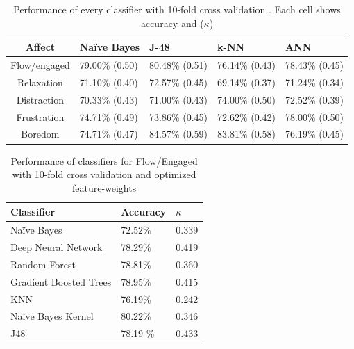 \documentclass[a4paper,twoside]{article}
\begin{document}
\begin{table}[!t]
\centering
\caption{Performance of every classifier with 10-fold cross validation \cite{ijcci17}. Each cell shows accuracy and ($\kappa$)}
\label{tab_performance}
    \begin{tabular}{ | c | l | l | l | l | }
    \hline
    Affect          & Na\"ive Bayes           & J-48                & k-NN              & ANN \\
    \hline
    Flow/engaged    & 79.00\% (0.50) & 80.48\% (0.51) & 76.14\% (0.43) & 78.43\% (0.45) \\
    \hline
    Relaxation      & 71.10\% (0.40) & 72.57\% (0.45) & 69.14\% (0.37) & 71.24\% (0.34)\\
    \hline
    Distraction     & 70.33\% (0.43) & 71.00\% (0.43) & 74.00\% (0.50) & 72.52\% (0.39)\\
    \hline
    Frustration     & 74.71\% (0.49) & 73.86\% (0.45) & 72.62\% (0.42) & 78.00\% (0.50)\\
    \hline
    Boredom         & 74.71\% (0.47) & 84.57\% (0.59) & 83.81\% (0.58) & 76.19\% (0.45)\\
    \hline
    \end{tabular}
\end{table}



\begin{table}[!t]
\centering
\caption{Performance of classifiers for Flow/Engaged  with 10-fold cross validation and optimized feature-weights }
\label{tab_perf_flow}
    \begin{tabular}{ | l | l | l | }
    \hline
    Classifier   &  Accuracy            & $\kappa$                 \\
    \hline
    Na\"ive Bayes     & 72.52\%  & 0.339  \\
    \hline
    Deep Neural Network     & 78.29\%  & 0.419  \\
    \hline
    Random Forest      & 78.81\%  & 0.360  \\
    \hline
    Gradient Boosted Trees     & 78.95\%  & 0.415  \\
    \hline
    KNN      & 76.19\%  & 0.242  \\
    \hline
    Na\"ive Bayes Kernel     & 80.22\%  & 0.346 \\
    \hline
    J48     & 78.19 \%  & 0.433  \\
    \hline
  
    \end{tabular}
\end{table}
\end{document}
